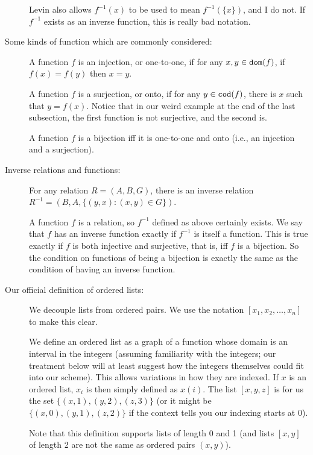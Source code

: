 \documentclass[12pt]{article}
\begin{document}
\begin{description}
Levin also allows $f^{-1}(x)$ to be used to mean $f^{-1}(\{x\})$, and I do not.  If $f^{-1}$ exists as an inverse function, this is really bad notation.


\item[Some kinds of function which are commonly considered:]

A function $f$ is an injection, or one-to-one, if for any $x,y \in {\tt dom}(f)$, if $f(x)=f(y)$ then $x=y$.

A function $f$ is a surjection, or onto, if for any $y \in {\tt cod}(f)$, there is $x$ such that $y = f(x)$.  Notice that in our weird example at the end of the last subsection, the first function is not surjective, and the second is.

A function $f$ is a bijection iff it is one-to-one and onto (i.e., an injection and a surjection).

\item[Inverse relations and functions:]

For any relation $R=(A,B,G)$, there is an inverse relation $R^{-1} = (B,A,\{(y,x):(x,y)\in G\})$.

A function $f$ is a relation, so $f^{-1}$ defined as above certainly exists.  We say that $f$ has an inverse function exactly if $f^{-1}$ is itself a function.  This is true exactly if $f$ is both injective and surjective, that is, iff $f$ is a bijection.  So the condition on functions of being a bijection is exactly the same as the condition of having an inverse function.

\item[Our official definition of ordered lists:]  We decouple lists from ordered pairs.  We use the notation
$[x_1,x_2,\ldots,x_n]$ to make this clear.

We define an ordered list as a graph of a function whose domain is an interval in the integers (assuming familiarity with the integers;  our treatment below will at least suggest how the integers themselves could fit into our scheme).  This allows variations in how
they are indexed.  If $x$ is an ordered list, $x_i$ is then simply defined as $x(i)$.  The list $[x,y,z]$ is for us
the set $\{(x,1),(y,2),(z,3)\}$ (or it might be $\{(x,0),(y,1),(z,2)\}$ if the context tells you our indexing starts at 0).

Note that this definition supports lists of length 0 and 1 (and lists $[x,y]$ of length 2 are not the same as ordered pairs $(x,y)$).


\end{description}
\end{document}
